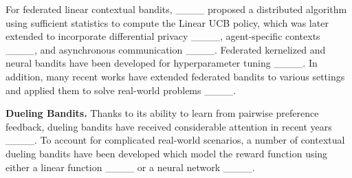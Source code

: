 For federated linear contextual bandits, ____ proposed a distributed algorithm using sufficient statistics to compute the Linear UCB policy, which was later extended to incorporate differential privacy ____, agent-specific contexts ____, and asynchronous communication ____. 
Federated kernelized 
and neural bandits have been developed for hyperparameter tuning ____.
In addition, many recent works have extended federated bandits to various settings and applied them to solve real-world problems ____.


\textbf{Dueling Bandits.}
Thanks to its ability to learn from pairwise preference feedback, dueling bandits have received considerable attention in recent years
____. 
To account for complicated real-world scenarios, a number of contextual dueling bandits have been developed which model the reward function using either a linear function
____ or a neural network ____.

\vspace{-1.2mm}
